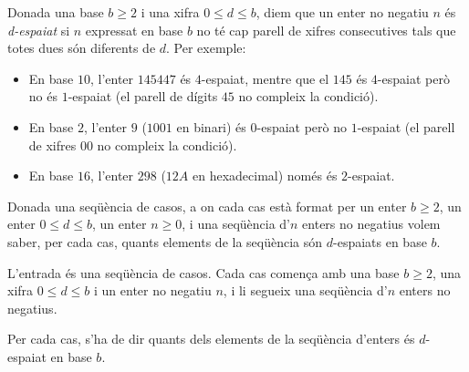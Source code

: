 

\Statement

Donada una base $b \geq 2$ i una xifra $0 \leq d \leq b$, diem que un enter no negatiu $n$ és \emph{d-espaiat} si $n$ expressat en base $b$ no té cap parell de xifres consecutives tals que totes dues són diferents de $d$. Per exemple:

\begin{itemize}
\item En base $10$, l'enter $145447$ és $4$-espaiat, mentre que el $145$ és $4$-espaiat però no és $1$-espaiat (el parell de dígits $45$ no compleix la condició).

\item En base $2$, l'enter $9$ ($1001$ en binari) és $0$-espaiat però no $1$-espaiat (el parell de xifres $00$ no compleix la condició).

\item En base $16$, l'enter $298$ ($12A$ en hexadecimal) només és $2$-espaiat.
\end{itemize}

\medskip

Donada una seqüència de casos, a on cada cas està format per un enter $b \geq 2$, un enter $0 \leq d \leq b$, un enter $n \geq 0$, i una seqüència d'$n$ enters no negatius volem saber, per cada cas, quants elements de la seqüència són $d$-espaiats en base $b$.

\Input

L'entrada és una seqüència de casos. Cada cas comença amb una base $b \geq 2$, una xifra $0 \leq d \leq b$ i un enter no negatiu $n$, i li segueix una seqüència d'$n$ enters no negatius.


\Output

Per cada cas, s'ha de dir quants dels elements de la seqüència d'enters és $d$-espaiat en base $b$.

\Sample
